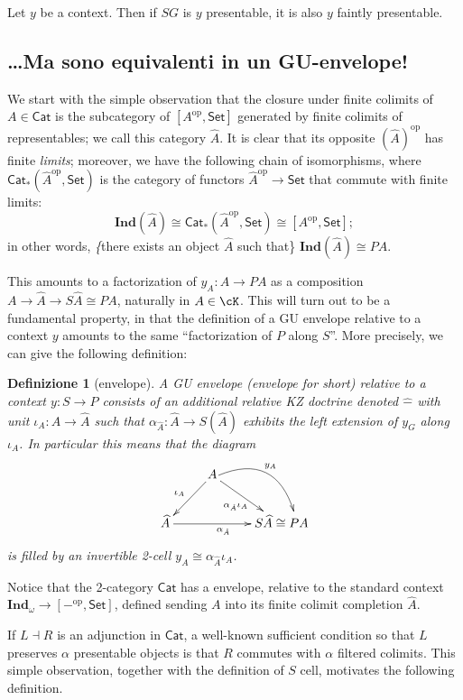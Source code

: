 \documentclass[11pt]{article}
\def\Cat{\mathsf{Cat}}
\def\Set{\mathsf{Set}}
\def\opp{\mathrm{op}}
\theoremstyle{reference}
\newtheorem{definition}[theorem]{Definizione}
\begin{document}
\begin{prop}
Let \(y\) be a context. Then if \(S G\) is \(y\) presentable, it is also \(y\) faintly presentable.


\subsection{\ldots{}Ma sono equivalenti in un GU-envelope!}
\label{sec:org23001f4}

We start with the simple observation that the closure under finite colimits of \(A\in\Cat\) is the subcategory of \([A^\opp,\Set]\) generated by finite colimits of representables; we call this category \(\widehat A\). It is clear that its opposite \((\widehat{A})^\opp\) has finite \emph{limits}; moreover, we have the following chain of isomorphisms, where \(\Cat_*(\widehat{A}^\opp,\Set)\) is the category of functors \(\widehat{A}^\opp\to \Set\) that commute with finite limits:
\[
	\boldsymbol{Ind}(\widehat{A}) \cong \Cat_*(\widehat{A}^\opp,\Set)\cong [A^\opp,\Set];
\]
in other words, \emph\{there exists an object \(\widehat{A}\) such that\} \(\boldsymbol{Ind}(\widehat A)\cong P A\).

This amounts to a factorization of \(y_A : A \to P A\) as a composition \(A\to \widehat A \to S \widehat A\cong P A\), naturally in \(A\in\cK\). This will turn out to be a fundamental property, in that the definition of a GU envelope relative to a context \(y\) amounts to the same ``factorization of \(P\) along \(S\)''. More precisely, we can give the following definition:
\begin{definition}[\gu envelope]\label{guenvelope}
	A \emph{GU envelope} (\emph{\gu envelope} for short) relative to a context $y : S\to P$ consists of an additional relative KZ doctrine denoted $\widehat{ - }$ with unit $\iota_A : A\to \widehat A$ such that $ \alpha_{\hat A} : \widehat A \to S(\widehat A)$ exhibits the left extension of $y_G$ along $\iota_A$. In particular this means that the diagram
	\[
		\vcenter{\xymatrix{
		&A\ar[dr]_{ \alpha_{\hat A}\iota_A}\ar[dl]_{\iota_A}&\\
		\widehat A\ar[rr]_{ \alpha_{\hat A}} && S \widehat A \cong P A
		\ar@/^1.5pc/(15,0);(36,-10)^{y_A}
		}}
	\]
	is filled by an invertible 2-cell $y_A \cong  \alpha_{\hat A}\iota_A$.
\end{definition}
Notice that the 2-category \(\Cat\) has a \gu envelope, relative to the standard context \(\boldsymbol{Ind}_\omega\to [ - ^\opp,\Set]\), defined sending \(A\) into its finite colimit completion \(\widehat A\).
\begin{rmk}
	If $L\dashv R$ is an adjunction in $\Cat$, a well-known sufficient condition so that $L$ preserves $\alpha$ presentable objects is that $R$ commutes with $\alpha$ filtered colimits.
	This simple observation, together with the definition of $S$ cell, motivates the following definition.
\end{rmk}



\end{prop}
\end{document}
